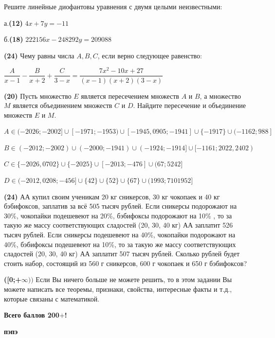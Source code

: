 \hspace{3mm}



 Решите линейные диофантовы уравнения с двумя целыми неизвестными:

а.\textbf{(12)} $4x+7y=-11$

б.\textbf{(18)} $222156x-248292y=209088$



\textbf{(24)} Чему равны числа $A,B,C$, если верно следующее равенство:

$\dfrac{A}{x-1}-\dfrac{B}{x+2}+\dfrac{C}{3-x}=\dfrac{7x^2-10x+27}{(x-1)(x+2)(3-x)}$


\textbf{(20)} Пусть множество $E$ является пересечением множеств $A$ и $B$, а множество $M$ является
объединением множеств $C$ и $D$. Найдите пересечение и объединение множеств $E$ и $M$.

$A \in (-2026;-2002] \cup [-1971;-1953) \cup [-1945,0905;-1941] \cup \{-1917\} \cup (-1162;988]$ 

$B \in (-2012;-2002) \cup (-2000;-1941) \cup (-1924;-1914] \cup [-1161;2022,2402)$ 

$C \in  \{-2026,0702\} \cup \{-2025\} \cup [-2013;-476] \cup (67;5242] $

$D \in (-2012,0208;-456] \cup \{42\} \cup \{52\} \cup \{67\} \cup (1993;7101952]$ 


\textbf{(24)} АА купил своим ученикам 20 кг сникерсов, 30 кг чокопаек и 40 кг бэбифоксов, заплатив за всё 505 тысяч рублей. Если сникерсы подорожают на 30\%, чокопайки подешевеют на 20\%, бэбифоксы подорожают на 10\% , то за такую же массу соответствующих сладостей (20, 30, 40 кг) АА заплатит 526 тысяч рублей. Если сникерсы подешевеют на 40\%, чокопайки подорожают на 40\%, бэбифоксы подешевеют на 10\%, то за такую же массу соответствующих сладостей (20, 30, 40 кг) АА заплатит 507 тысяч рублей. Сколько рублей будет стоить набор, состоящий из 560 г сникерсов, 600 г чокопаек и 650 г бэбифоксов?

\textbf{([0;+$\infty))$} Если Вы ничего больше не можете решить, то в этом задании Вы можете написать все теоремы, признаки, свойства, интересные факты и т.д., которые связаны с математикой. 

\centerline{\textbf{Всего баллов 200$+$!}}
\centerline{\textbf{пэпэ}}